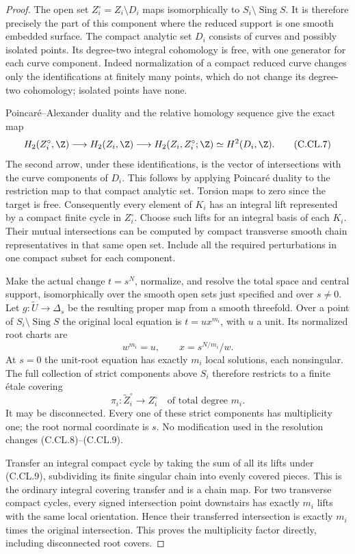 \begin{proof}
The open set
$Z_i^\circ=Z_i\setminus D_i$ maps isomorphically
to $S_i\setminus\operatorname{Sing}S$. It is
therefore precisely the part of this component
where the reduced support is one smooth embedded
surface. The compact analytic set $D_i$ consists
of curves and possibly isolated points. Its
degree-two integral cohomology is free, with
one generator for each curve component. Indeed
normalization of a compact reduced curve changes
only the identifications at finitely many points,
which do not change its degree-two cohomology;
isolated points have none.

Poincar\'e--Alexander duality and the relative
homology sequence give the exact map
\[
 H_2(Z_i^\circ,\Z)\longrightarrow H_2(Z_i,\Z)
 \longrightarrow H_2(Z_i,Z_i^\circ;\Z)
       \simeq H^2(D_i,\Z).                          \tag{C.CL.7}
\]
The second arrow, under these identifications,
is the vector of intersections with the curve
components of $D_i$. This follows by applying
Poincar\'e duality to the restriction map to
that compact analytic set. Torsion maps to
zero since the target is free. Consequently
every element of $K_i$ has an integral lift
represented by a compact finite cycle in
$Z_i^\circ$. Choose such lifts for an integral
basis of each $K_i$. Their mutual intersections
can be computed by compact transverse smooth
chain representatives in that same open set.
Include all the required perturbations in
one compact subset for each component.

Make the actual change $t=s^N$, normalize,
and resolve the total space and central support,
isomorphically over the smooth open sets just
specified and over $s\ne0$. Let
$g:\widetilde U\to\Delta_s$ be the resulting
proper map from a smooth threefold. Over a
point of $S_i\setminus\operatorname{Sing}S$
the original local equation is
$t=u x^{m_i}$, with $u$ a unit. Its normalized
root charts are
\[
       w^{m_i}=u,\qquad x=s^{N/m_i}/w.               \tag{C.CL.8}
\]
At $s=0$ the unit-root equation has exactly
$m_i$ local solutions, each nonsingular.
The full collection of strict components
above $S_i$ therefore restricts to a finite
\'etale covering
\[
        \pi_i:\widetilde Z_i^\circ
                       \longrightarrow Z_i^\circ
                  \quad\text{of total degree }m_i.  \tag{C.CL.9}
\]
It may be disconnected. Every one of these
strict components has multiplicity one;
the root normal coordinate is $s$.
No modification used in the resolution
changes (C.CL.8)--(C.CL.9).

Transfer an integral compact cycle by taking
the sum of all its lifts under (C.CL.9),
subdividing its finite singular chain into
evenly covered pieces. This is the ordinary
integral covering transfer and is a chain
map. For two transverse compact cycles,
every signed intersection point downstairs
has exactly $m_i$ lifts with the same local
orientation. Hence their transferred
intersection is exactly $m_i$ times the
original intersection. This proves the
multiplicity factor directly, including
disconnected root covers.


\end{proof}
